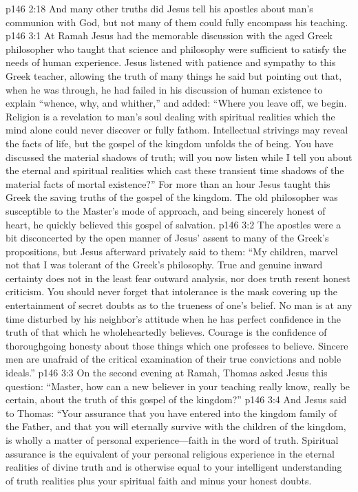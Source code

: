 \pc \vs p146 2:18 And many other truths did Jesus tell his apostles about man’s communion with God, but not many of them could fully encompass his teaching.
\vs p146 3:1 At Ramah Jesus had the memorable discussion with the aged Greek philosopher who taught that science and philosophy were sufficient to satisfy the needs of human experience. Jesus listened with patience and sympathy to this Greek teacher, allowing the truth of many things he said but pointing out that, when he was through, he had failed in his discussion of human existence to explain \textcolor{ubdarkred}{“whence, why, and whither,”} and added: \textcolor{ubdarkred}{“Where you leave off, we begin. Religion is a revelation to man’s soul dealing with spiritual realities which the mind alone could never discover or fully fathom. Intellectual strivings may reveal the facts of life, but the gospel of the kingdom unfolds the  of being. You have discussed the material shadows of truth; will you now listen while I tell you about the eternal and spiritual realities which cast these transient time shadows of the material facts of mortal existence?”} For more than an hour Jesus taught this Greek the saving truths of the gospel of the kingdom. The old philosopher was susceptible to the Master’s mode of approach, and being sincerely honest of heart, he quickly believed this gospel of salvation.
\vs p146 3:2 The apostles were a bit disconcerted by the open manner of Jesus’ assent to many of the Greek’s propositions, but Jesus afterward privately said to them: \textcolor{ubdarkred}{“My children, marvel not that I was tolerant of the Greek’s philosophy. True and genuine inward certainty does not in the least fear outward analysis, nor does truth resent honest criticism. You should never forget that intolerance is the mask covering up the entertainment of secret doubts as to the trueness of one’s belief. No man is at any time disturbed by his neighbor’s attitude when he has perfect confidence in the truth of that which he wholeheartedly believes. Courage is the confidence of thoroughgoing honesty about those things which one professes to believe. Sincere men are unafraid of the critical examination of their true convictions and noble ideals.”}
\pc \vs p146 3:3 On the second evening at Ramah, Thomas asked Jesus this question: “Master, how can a new believer in your teaching really know, really be certain, about the truth of this gospel of the kingdom?”
\vs p146 3:4 And Jesus said to Thomas: \textcolor{ubdarkred}{“Your assurance that you have entered into the kingdom family of the Father, and that you will eternally survive with the children of the kingdom, is wholly a matter of personal experience---faith in the word of truth. Spiritual assurance is the equivalent of your personal religious experience in the eternal realities of divine truth and is otherwise equal to your intelligent understanding of truth realities plus your spiritual faith and minus your honest doubts.}
